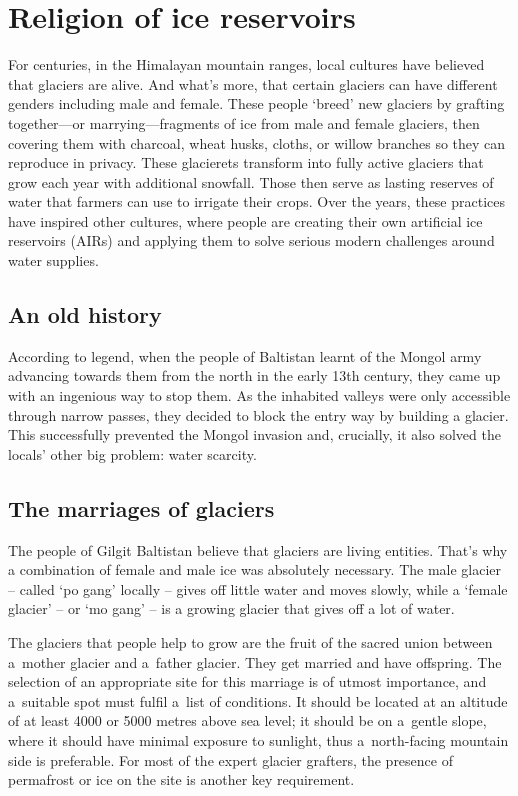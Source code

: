 \chapter{Religion of ice reservoirs}

For centuries, in the Himalayan mountain ranges, local cultures have believed that glaciers are alive. And
what’s more, that certain glaciers can have different genders including male and female. These people ‘breed’
new glaciers by grafting together—or marrying—fragments of ice from male and female glaciers, then covering them
with charcoal, wheat husks, cloths, or willow branches so they can reproduce in privacy. These glacierets
transform into fully active glaciers that grow each year with additional snowfall. Those then serve as lasting
reserves of water that farmers can use to irrigate their crops. Over the years, these practices have inspired
other cultures, where people are creating their own artificial ice reservoirs (AIRs) and applying them to solve
serious modern challenges around water supplies.

\section{An old history}

According to legend, when the people of Baltistan learnt of the Mongol army advancing towards
them from the north in the early 13th century, they came up with an ingenious way to stop them. As the inhabited
valleys were only accessible through narrow passes, they decided to block the entry way by building a glacier.
This successfully prevented the Mongol invasion and, crucially, it also solved the locals’ other big problem:
water scarcity.

\section{The marriages of glaciers}

The people of Gilgit Baltistan believe that glaciers are living entities. That’s why a combination of female and
male ice was absolutely necessary. The male glacier – called ‘po gang’ locally – gives off little water and
moves slowly, while a ‘female glacier’ – or ‘mo gang’ – is a growing glacier that gives off a lot of water.

The glaciers that people help to grow are the fruit of the sacred union between a mother glacier and a father
glacier. They get married and have offspring. The selection of an appropriate site for this marriage is of
utmost importance, and a suitable spot must fulfil a list of conditions. It should be located at an altitude of
at least 4000 or 5000 metres above sea level; it should be on a gentle slope, where it should have minimal
exposure to sunlight, thus a north-facing mountain side is preferable. For most of the expert glacier grafters,
the presence of permafrost or ice on the site is another key requirement. 

